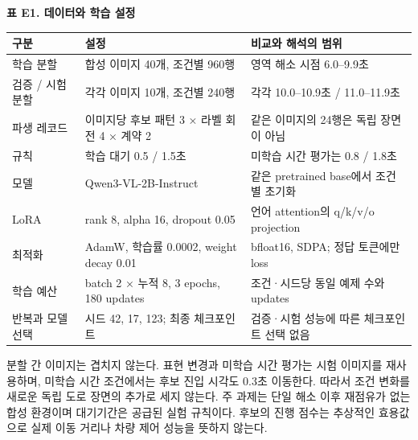 \documentclass[11pt,a4paper]{article}
\begin{document}
\par\medskip\noindent\begin{minipage}{\linewidth}
\textbf{표 E1. 데이터와 학습 설정}\par

\par\medskip\noindent\begin{minipage}{\linewidth}\small
\begin{tabular}{@{}>{\raggedright\arraybackslash}p{}>{\raggedright\arraybackslash}p{}>{\raggedright\arraybackslash}p{}@{}}
\toprule
\textbf{구분} & \textbf{설정} & \textbf{비교와 해석의 범위} \\
\midrule
학습 분할 & 합성 이미지 40개, 조건별 960행 & 영역 해소 시점 6.0–9.9초 \\
검증 / 시험 분할 & 각각 이미지 10개, 조건별 240행 & 각각 10.0–10.9초 / 11.0–11.9초 \\
파생 레코드 & 이미지당 후보 패턴 3 × 라벨 회전 4 × 계약 2 & 같은 이미지의 24행은 독립 장면이 아님 \\
규칙 & 학습 대기 0.5 / 1.5초 & 미학습 시간 평가는 0.8 / 1.8초 \\
모델 & Qwen3-VL-2B-Instruct & 같은 pretrained base에서 조건별 초기화 \\
LoRA & rank 8, alpha 16, dropout 0.05 & 언어 attention의 q/k/v/o projection \\
최적화 & AdamW, 학습률 0.0002, weight decay 0.01 & bfloat16, SDPA; 정답 토큰에만 loss \\
학습 예산 & batch 2 × 누적 8, 3 epochs, 180 updates & 조건·시드당 동일 예제 수와 updates \\
반복과 모델 선택 & 시드 42, 17, 123; 최종 체크포인트 & 검증·시험 성능에 따른 체크포인트 선택 없음 \\
\bottomrule\end{tabular}\end{minipage}\par\medskip
\end{minipage}\par\medskip

분할 간 이미지는 겹치지 않는다. 표현 변경과 미학습 시간 평가는 시험 이미지를 재사용하며, 미학습 시간 조건에서는 후보 진입 시각도 0.3초 이동한다. 따라서 조건 변화를 새로운 독립 도로 장면의 추가로 세지 않는다. 주 과제는 단일 해소 이후 재점유가 없는 합성 환경이며 대기기간은 공급된 실험 규칙이다. 후보의 진행 점수는 추상적인 효용값으로 실제 이동 거리나 차량 제어 성능을 뜻하지 않는다.\par
\end{document}
